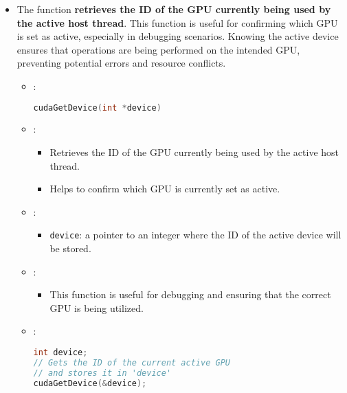 \begin{itemize}
    \item The  function \textbf{retrieves the ID of the GPU currently being used by the active host thread}. This function is useful for confirming which GPU is set as active, especially in debugging scenarios. Knowing the active device ensures that operations are being performed on the intended GPU, preventing potential errors and resource conflicts.
    \begin{itemize}
        \item {}:
        \begin{lstlisting}[language=C++]
cudaGetDevice(int *device)\end{lstlisting}
        \item {}:
        \begin{itemize}
            \item Retrieves the ID of the GPU currently being used by the active host thread.
            \item Helps to confirm which GPU is currently set as active.
        \end{itemize}
        \item {}:
        \begin{itemize}
            \item \texttt{device}: a pointer to an integer where the ID of the active device will be stored.
        \end{itemize}
        \item {}:
        \begin{itemize}
            \item This function is useful for debugging and ensuring that the correct GPU is being utilized.
        \end{itemize}
        \item {}:
        \begin{lstlisting}[language=C++]
int device;
// Gets the ID of the current active GPU
// and stores it in 'device'
cudaGetDevice(&device);\end{lstlisting}
    \end{itemize}
    

\end{itemize}
